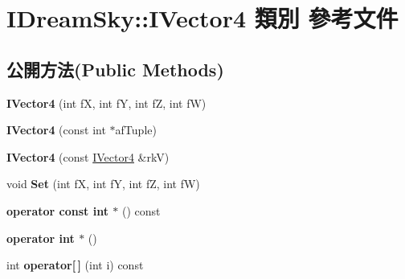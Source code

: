 \hypertarget{class_i_dream_sky_1_1_i_vector4}{}\section{I\+Dream\+Sky\+:\+:I\+Vector4 類別 參考文件}
\label{class_i_dream_sky_1_1_i_vector4}
\subsection*{公開方法(Public Methods)}
\begin{DoxyCompactItemize}
\item 
{\bfseries I\+Vector4} (int fX, int fY, int fZ, int fW)\hypertarget{class_i_dream_sky_1_1_i_vector4_a6d9b3feb4b5ba4e287d8f005af8316c5}{}\label{class_i_dream_sky_1_1_i_vector4_a6d9b3feb4b5ba4e287d8f005af8316c5}

\item 
{\bfseries I\+Vector4} (const int $\ast$af\+Tuple)\hypertarget{class_i_dream_sky_1_1_i_vector4_adc5fa1fcae6a38bb1fd209f75dbe1bb0}{}\label{class_i_dream_sky_1_1_i_vector4_adc5fa1fcae6a38bb1fd209f75dbe1bb0}

\item 
{\bfseries I\+Vector4} (const \hyperlink{class_i_dream_sky_1_1_i_vector4}{I\+Vector4} \&rkV)\hypertarget{class_i_dream_sky_1_1_i_vector4_a8ecf93a17161d81416ce0330c0f61104}{}\label{class_i_dream_sky_1_1_i_vector4_a8ecf93a17161d81416ce0330c0f61104}

\item 
void {\bfseries Set} (int fX, int fY, int fZ, int fW)\hypertarget{class_i_dream_sky_1_1_i_vector4_aed071e0f00187b9740b97b6340aa447f}{}\label{class_i_dream_sky_1_1_i_vector4_aed071e0f00187b9740b97b6340aa447f}

\item 
{\bfseries operator const int $\ast$} () const \hypertarget{class_i_dream_sky_1_1_i_vector4_a90ee8d2e58c7eeae1c2e58047afcffcb}{}\label{class_i_dream_sky_1_1_i_vector4_a90ee8d2e58c7eeae1c2e58047afcffcb}

\item 
{\bfseries operator int $\ast$} ()\hypertarget{class_i_dream_sky_1_1_i_vector4_a2e6c3b0fccca033e9cff1e188c142fb4}{}\label{class_i_dream_sky_1_1_i_vector4_a2e6c3b0fccca033e9cff1e188c142fb4}

\item 
int {\bfseries operator\mbox{[}$\,$\mbox{]}} (int i) const \hypertarget{class_i_dream_sky_1_1_i_vector4_a721bb1731a5f4a73de5d019272e18c89}{}\label{class_i_dream_sky_1_1_i_vector4_a721bb1731a5f4a73de5d019272e18c89}


\end{DoxyCompactItemize}
